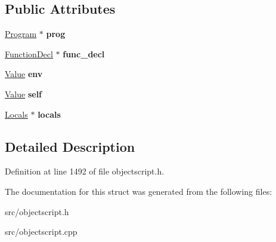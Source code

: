 \subsection*{Public Attributes}
\begin{DoxyCompactItemize}
\item 
\hyperlink{class_object_script_1_1_o_s_1_1_core_1_1_program}{Program} $\ast$ {\bfseries prog}\hypertarget{struct_object_script_1_1_o_s_1_1_core_1_1_g_c_function_value_a901b279b2092f66adfb80e32d69a7d1c}{}\label{struct_object_script_1_1_o_s_1_1_core_1_1_g_c_function_value_a901b279b2092f66adfb80e32d69a7d1c}

\item 
\hyperlink{struct_object_script_1_1_o_s_1_1_core_1_1_function_decl}{Function\+Decl} $\ast$ {\bfseries func\+\_\+decl}\hypertarget{struct_object_script_1_1_o_s_1_1_core_1_1_g_c_function_value_aff37e40243270839c274632e5bcbcd4f}{}\label{struct_object_script_1_1_o_s_1_1_core_1_1_g_c_function_value_aff37e40243270839c274632e5bcbcd4f}

\item 
\hyperlink{struct_object_script_1_1_o_s_1_1_core_1_1_value}{Value} {\bfseries env}\hypertarget{struct_object_script_1_1_o_s_1_1_core_1_1_g_c_function_value_a7405ae9b5504caf01c63f2e1de118308}{}\label{struct_object_script_1_1_o_s_1_1_core_1_1_g_c_function_value_a7405ae9b5504caf01c63f2e1de118308}

\item 
\hyperlink{struct_object_script_1_1_o_s_1_1_core_1_1_value}{Value} {\bfseries self}\hypertarget{struct_object_script_1_1_o_s_1_1_core_1_1_g_c_function_value_a669266ed2953c677952110af7f9ac622}{}\label{struct_object_script_1_1_o_s_1_1_core_1_1_g_c_function_value_a669266ed2953c677952110af7f9ac622}

\item 
\hyperlink{struct_object_script_1_1_o_s_1_1_core_1_1_locals}{Locals} $\ast$ {\bfseries locals}\hypertarget{struct_object_script_1_1_o_s_1_1_core_1_1_g_c_function_value_a20009e4f60a0bf9e51a5c86db2636727}{}\label{struct_object_script_1_1_o_s_1_1_core_1_1_g_c_function_value_a20009e4f60a0bf9e51a5c86db2636727}

\end{DoxyCompactItemize}


\subsection{Detailed Description}


Definition at line 1492 of file objectscript.\+h.



The documentation for this struct was generated from the following files\+:\begin{DoxyCompactItemize}
\item 
src/objectscript.\+h\item 
src/objectscript.\+cpp\end{DoxyCompactItemize}
